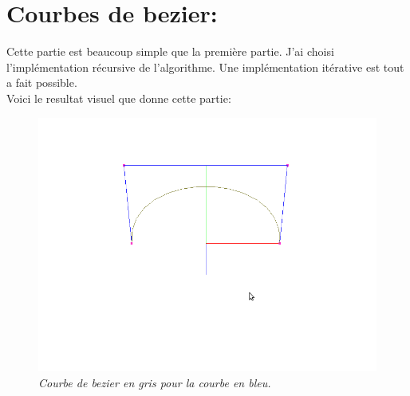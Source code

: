 \documentclass[12pt,letterpaper]{article}
\begin{document}
    \section{Courbes de bezier:}
	\setlength{\parindent}{1cm}
    Cette partie est beaucoup simple que la première partie. J'ai choisi l'implémentation récursive de l'algorithme. Une implémentation itérative est tout a fait possible.\\
    Voici le resultat visuel que donne cette partie:
    \begin{figure}[h!]
	\centering
	\includegraphics[scale=0.3]{images/bezier.png}
	\caption{\textit{Courbe de bezier en gris pour la courbe en bleu.}}
	\end{figure}
\end{document}
